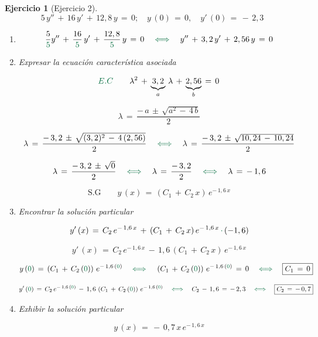 \documentclass[a4paper,11pt, openany]{book}
\newtheorem{ejer}{Ejercicio}[section]
\newcommand*{\itembolasazules}[1]{%
\footnotesize\protect\tikz[baseline=-3pt]%
\protect\node[scale=.7, circle, shade, ball
color=green]{\color{white}\Large\bf#1};}
\begin{document}
\begin{ejer}[Ejercicio 2]
 
$$5\,y''\,+\,16\,y'\,+\,12,8\,y\,=\,0; \quad y\,(0)\,=\,0, \quad y'\,(0)\,=\,-\,2,3$$
 
\begin{enumerate}[label=\itembolasazules{\arabic*}]
 
 
\item $$\dfrac{5}{\textcolor{cadmiumgreen}{5} }y''\,+\,\dfrac{16}{\textcolor{cadmiumgreen}{5}}\,y'\,+\,\dfrac{12,8}{\textcolor{cadmiumgreen}{5}}\,y\,=\,0 \quad \textcolor{cadmiumgreen}{\iff} \quad y''\,+\,3,2\,y'\,+\,2,56\,y\,=\,0$$
 
\item Expresar la ecuación característica asociada
 
$$\textcolor{cadmiumgreen}{E.C} \qquad \lambda^{2}\,+\,\underbrace{3,2}_{a}\,\lambda\,+\,\underbrace{2,56}_{b}\,=\,0$$
 
$$\boxed{\lambda\,=\,\dfrac{-\,a\,\pm\,\sqrt{a^{2}\,-\,4\,b } }{2} }$$
 
$$\lambda\,=\,\dfrac{-\,3,2\,\pm\,\sqrt{(3,2)^{2}\,-\,4\,(2,56) } }{2} \quad \textcolor{cadmiumgreen}{\iff} \quad \lambda\,=\,\dfrac{-\,3,2\,\pm\,\sqrt{10,24\,-\,10,24} }{2}$$
 
$$\lambda\,=\,\dfrac{-\,3,2\,\pm\,\sqrt{0} }{2} \quad \textcolor{cadmiumgreen}{\iff} \quad \lambda\,=\,\dfrac{-\,3,2}{2} \quad \textcolor{cadmiumgreen}{\iff} \quad \lambda\,=\,-\,1,6$$
 
$$\text{S.G} \qquad \boxed{y\,(x)\,=\,(C_{1}\,+\,C_{2}\,x)\,e^{-\,1,6\,x}}$$
 
\item Encontrar la solución particular
 
$$y'\,(x)\,=\,C_{2}\,e^{-\,1,6\,x}\,+\,(C_{1}\,+\,C_{2}\,x)\,e^{-\,1,6\,x}\,\textcolor{cadmiumgreen}{\cdot}\,(-1,6)$$
 
$$\boxed{y'\,(x)\,=\,C_{2}\,e^{-\,1,6\,x}\,-\,1,6\,(C_{1}\,+\,C_{2}\,x)\,e^{-\,1,6\,x}}$$
 
$$y\,(\textcolor{cadmiumgreen}{0})\,=\,\left(C_{1}\,+\,C_{2}\,(\textcolor{cadmiumgreen}{0}) \right)\,e^{-\,1,6\,(\textcolor{cadmiumgreen}{0})} \quad \textcolor{cadmiumgreen}{\iff} \quad \left(C_{1}\,+\,C_{2}\,(\textcolor{cadmiumgreen}{0}) \right)\,e^{-\,1,6\,(\textcolor{cadmiumgreen}{0})}\,=\,0 \quad \textcolor{cadmiumgreen}{\iff} \quad \boxed{C_{1}\,=\,0 }$$
 
$$y'\,(\textcolor{cadmiumgreen}{0})\,=\,C_{2}\,e^{-\,1,6\,(\textcolor{cadmiumgreen}{0})}\,-\,1,6\,\left(C_{1}\,+\,C_{2}\,(\textcolor{cadmiumgreen}{0}) \right)\,e^{-\,1,6\,(\textcolor{cadmiumgreen}{0})} \quad \textcolor{cadmiumgreen}{\iff} \quad C_{2}\,-\,1,6\,=\,-\,2,3 \quad \textcolor{cadmiumgreen}{\iff} \quad \boxed{ C_{2}\,=\,-\,0,7}$$
 
\item Exhibir la solución particular
 
$$\boxed{y\,(x)\,=\,-\,0,7\,x\,e^{-\,1,6\,x} } $$
 
\end{enumerate}
 
\end{ejer}
 
\end{document}
